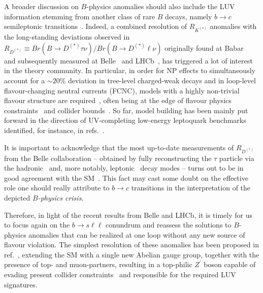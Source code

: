 A broader discussion on $B$-physics anomalies should also include the LUV information stemming from another class of rare $B$ decays, namely $b \to c$ semileptonic transitions~\cite{Azatov:2018knx,Alok:2019uqc,Murgui:2019czp,Shi:2019gxi}. Indeed, a combined resolution of $R_{K^{(*)}}$ anomalies with the long-standing deviations observed in $R_{D^{(*)}} \equiv Br(B \to D^{(*)} \tau \nu) / Br(B \to D^{(*)} \ell \nu)$ originally found at Babar~\cite{Lees:2013uzd} and subsequently measured at Belle~\cite{Huschle:2015rga} and LHCb~\cite{Aaij:2017uff}, has triggered a lot of interest in the theory community. In particular, in order for NP effects to simultaneously account for a $\sim 20\%$ deviation in tree-level charged-weak decays and in loop-level flavour-changing neutral currents (FCNC), models with a highly non-trivial flavour structure are required~\cite{DiLuzio:2017vat,Calibbi:2017qbu,Bordone:2017bld,Barbieri:2017tuq,Assad:2017iib,Heeck:2018ntp,Fornal:2018dqn,Crivellin:2018yvo,Crivellin:2019dwb,Bordone:2019uzc}, often being at the edge of flavour physics constraints~\cite{Bona:2007vi,Silvestrini:2018dos} and collider bounds~\cite{Greljo:2017vvb,Baker:2019sli}.
%
So far, model building has been mainly put forward in the direction of UV-completing low-energy leptoquark benchmarks identified, for instance,  in refs.~\cite{Calibbi:2015kma,Dorsner:2016wpm,Buttazzo:2017ixm,Kumar:2018kmr,Cornella:2019hct}. 

It is important to acknowledge that the most up-to-date measurements of $R_{D^{(*)}}$ from the Belle collaboration -- obtained by fully reconstructing the $\tau$ particle via the hadronic~\cite{Hirose:2016wfn} and, more notably, leptonic~\cite{Abdesselam:2019dgh} decay modes -- turns out to be in good agreement with the SM~\cite{Bigi:2016mdz,Bernlochner:2017jka,Bigi:2017jbd,Jaiswal:2017rve}. This fact may cast some doubt on the effective role one should really attribute to $ b \to c $ transitions in the interpretation of the depicted \textit{$B$-physics crisis}.

Therefore, in light of the recent results from Belle and LHCb, it is timely for us to focus again on the $b \to s \ell \ell $ conundrum and reassess the solutions to $B$-physics anomalies that can be realized at one loop without any new source of flavour violation. The simplest resolution of these anomalies has been proposed in ref.~\cite{Kamenik:2017tnu}, extending the SM with a single new Abelian gauge group, together with the presence of top- and muon-partners, resulting in a top-philic $Z^\prime$ boson capable of evading present collider constraints~\cite{Fox:2018ldq} and responsible for the required LUV signatures.

